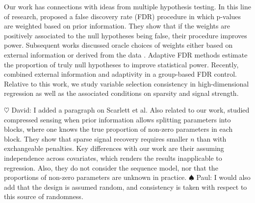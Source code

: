\documentclass[aos]{imsart}
\theoremstyle{plain}
\newcommand{\david}[1]{{\small{\color{blue} \sf $\heartsuit$ David: #1}}}
\newcommand{\paul}[1]{{\small{\color{green} \sf $\spadesuit$ Paul: #1}}}
\begin{document}
Our work has connections with ideas from multiple hypothesis testing. In this line of research, \cite{genovese2006} proposed a false discovery rate (FDR) %
procedure in which p-values are weighted based on prior information. They show that if the weights are positively associated to the null hypotheses being false, their procedure improves power. Subsequent works discussed oracle choices of weights either based on external information or derived from the data %
\cite{roederwasserman,basu}. 
Adaptive FDR methods \cite{blanchard} estimate the %
proportion of truly null hypotheses to improve statistical power.
Recently, \cite{ramdas2019prior} combined external information %
and adaptivity in a group-based FDR control. 
Relative to this work, we study %
variable selection consistency in high-dimensional regression %
as well as the associated conditions on sparsity and signal strength.

\david{I added a paragraph on Scarlett et al.}
\color{blue} Also related to our work, \cite{scarlett2012compressed} studied compressed sensing when prior information allows splitting parameters into blocks, where one knows the true proportion of non-zero parameters in each block. They show that sparse signal recovery requires smaller $n$ than with exchangeable penalties. Key differences with our work are their assuming independence across covariates, which renders the results inapplicable to regression. Also, they do not consider the sequence model, nor that the proportions of non-zero parameters are unknown in practice.   \color{black} \paul{I would also add that the design is assumed random, and consistency is taken with respect to this source of randomness.}
\end{document}

